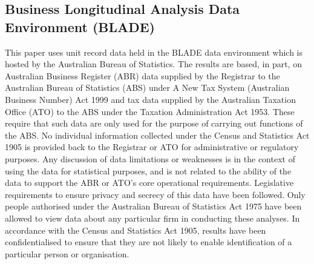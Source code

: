\documentclass[11pt,twocolumn,openany,leqno]{e61-research-note}
\begin{document}
\begin{appendix}
\section*{Business Longitudinal Analysis Data Environment (BLADE)}
This paper uses unit record data held in the BLADE data environment which is hosted by the Australian Bureau of Statistics. The results are based, in part, on Australian Business Register (ABR) data supplied by the Registrar to the Australian Bureau of Statistics (ABS) under A New Tax System (Australian Business Number) Act 1999 and tax data supplied by the Australian Taxation Office (ATO) to the ABS under the Taxation Administration Act 1953. These require that such data are only used for the purpose of carrying out functions of the ABS. No individual information collected under the Census and Statistics Act 1905 is provided back to the Registrar or ATO for administrative or regulatory purposes. Any discussion of data limitations or weaknesses is in the context of using the data for statistical purposes, and is not related to the ability of the data to support the ABR or ATO's core operational requirements. Legislative requirements to ensure privacy and secrecy of this data have been followed. Only people authorised under the Australian Bureau of Statistics Act 1975 have been allowed to view data about any particular firm in conducting these analyses. In accordance with the Census and Statistics Act 1905, results have been confidentialised to ensure that they are not likely to enable identification of a particular person or organisation.

\end{appendix}
\end{document}

